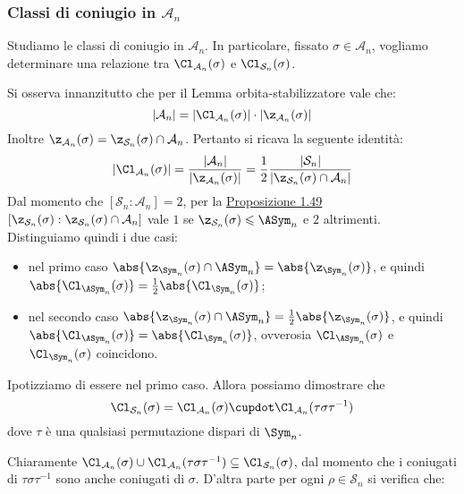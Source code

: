 \documentclass[11pt]{scrartcl}
\begin{document}
	\subsubsection{Classi di coniugio in \texorpdfstring{$\mathcal{A}_n$}{Aₙ}}
	
	Studiamo le classi di coniugio in $\mathcal{A}_n$. In particolare,
	fissato $\sigma \in \mathcal{A}_n$, vogliamo determinare una relazione tra
	$\Cl_{\mathcal{A}_n}(\sigma)$ e $\Cl_{\mathcal{S}_n}(\sigma)$. \medskip
	
	
	Si osserva innanzitutto che per il Lemma orbita-stabilizzatore vale che:
	\[ \lvert \mathcal{A}_n \rvert = \lvert \Cl_{\mathcal{A}_n}(\sigma)\rvert \cdot \lvert \z_{\mathcal{A}_n}(\sigma) \rvert \]
	Inoltre $\z_{\mathcal{A}_n}(\sigma) = \z_{\mathcal{S}_n}(\sigma) \cap \mathcal{A}_n$.
	Pertanto si ricava la seguente identità:
	\[
	\lvert \Cl_{\mathcal{A}_n}(\sigma) \rvert = \frac{\lvert\mathcal{A}_n\rvert}{\lvert \z_{\mathcal{A}_n}(\sigma) \rvert} =
	\frac 1 2 \frac{\lvert \mathcal{S}_n \rvert}{\lvert \z_{\mathcal{S}_n}(\sigma) \cap \mathcal{A}_n \rvert}
	\]
	Dal momento che $[\mathcal{S}_n:\mathcal{A}_n] = 2$, per la \hyperref[prop1.49]{Proposizione 1.49}
	$[\z_{\mathcal{S}_n}(\sigma): \z_{\mathcal{S}_n}(\sigma) \cap \mathcal{A}_n]$ vale
	$1$ se $\z_{\mathcal{S}_n}(\sigma) \leqslant \ASym_n$ e $2$
	altrimenti. Distinguiamo quindi i due casi:
	\begin{itemize}
		\item nel primo caso $\abs{\z_{\Sym_n}(\sigma) \cap \ASym_n} = \abs{\z_{\Sym_n}(\sigma)}$, e quindi $\abs{\Cl_{\ASym_n}(\sigma)} = \frac{1}{2} \abs{\Cl_{\Sym_n}(\sigma)}$;
		\item nel secondo caso $\abs{\z_{\Sym_n}(\sigma) \cap \ASym_n} = \frac{1}{2}\abs{\z_{\Sym_n}(\sigma)}$, e quindi $\abs{\Cl_{\ASym_n}(\sigma)} = \abs{\Cl_{\Sym_n}(\sigma)}$, ovverosia $\Cl_{\ASym_n}(\sigma)$ e
		$\Cl_{\Sym_n}(\sigma)$ coincidono.
	\end{itemize}

	Ipotizziamo di essere nel primo caso. Allora possiamo dimostrare che \[ \Cl_{\mathcal{S}_n}(\sigma) = \Cl_{\mathcal{A}_n}(\sigma) \cupdot
	\Cl_{\mathcal{A}_n}(\tau\sigma\tau^{-1}) \]
	dove $\tau$ è una qualsiasi permutazione dispari di $\Sym_n$. \medskip
	

	Chiaramente $\Cl_{\mathcal{A}_n}(\sigma) \cup \Cl_{\mathcal{A}_n}(\tau\sigma\tau^{-1})
	\subseteq \Cl_{\mathcal{S}_n}(\sigma)$, dal momento che i coniugati di $\tau\sigma\tau^{-1}$ sono anche
	coniugati di $\sigma$. D'altra parte per ogni $\rho \in \mathcal{S}_n$ si verifica che:
	
\end{document}
